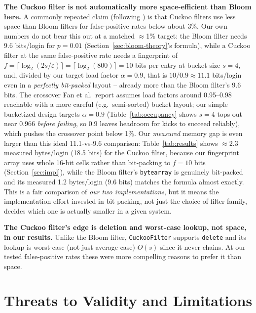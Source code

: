 \documentclass[acmsmall,screen,nonacm=true]{acmart}
\begin{document}
\textbf{The Cuckoo filter is not automatically more space-efficient than
Bloom here.} A commonly repeated claim (following \cite{fan2014}) is that
Cuckoo filters use less space than Bloom filters for false-positive rates
below about 3\%. Our own numbers do not bear this out at a matched
$\approx$1\% target: the Bloom filter needs 9.6 bits/login for $p=0.01$
(Section~\ref{sec:bloom-theory}'s formula), while a Cuckoo filter at the
same false-positive rate needs a fingerprint of $f=\lceil\log_2(2s/\varepsilon)\rceil=\lceil\log_2(800)\rceil=10$
bits per entry at bucket size $s=4$, and, divided by our target load factor
$\alpha=0.9$, that is $10/0.9\approx11.1$ bits/login even in a
\emph{perfectly bit-packed} layout -- already more than the Bloom filter's
9.6 bits. The crossover Fan et al.\ report assumes load factors around
0.95--0.98 reachable with a more careful (e.g.\ semi-sorted) bucket layout;
our simple bucketized design targets $\alpha=0.9$
(Table~\ref{tab:occupancy} shows $s=4$ tops out near 0.966 \emph{before
failing}, so 0.9 leaves headroom for kicks to succeed reliably), which
pushes the crossover point below 1\%. Our \emph{measured} memory gap is
even larger than this ideal 11.1-vs-9.6 comparison: Table~\ref{tab:results}
shows $\approx$2.3 measured bytes/login (18.5 bits) for the Cuckoo filter,
because our fingerprint array uses whole 16-bit cells rather than
bit-packing to $f=10$ bits (Section~\ref{sec:impl}), while the Bloom
filter's \texttt{bytearray} is genuinely bit-packed and its measured 1.2
bytes/login (9.6 bits) matches the formula almost exactly. This is a fair
comparison of \emph{our two implementations}, but it means the
implementation effort invested in bit-packing, not just the choice of
filter family, decides which one is actually smaller in a given system.

\textbf{The Cuckoo filter's edge is deletion and worst-case lookup, not
space, in our results.} Unlike the Bloom filter, \texttt{CuckooFilter}
supports \texttt{delete} and its lookup is worst-case (not just average-case)
$O(s)$ since it never chains. At our tested false-positive rates these
were more compelling reasons to prefer it than space.

\section{Threats to Validity and Limitations}
\label{sec:threats}
\end{document}
